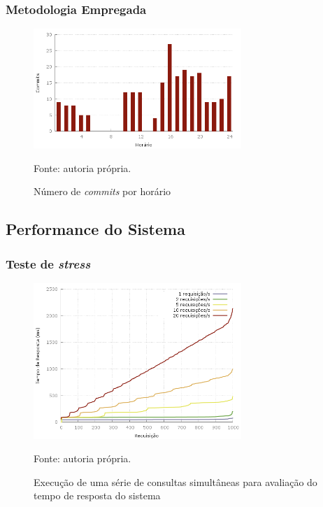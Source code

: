 \frame
{
\frametitle{Metodologia Empregada}
\begin{figure}
\includegraphics[width=0.7\textwidth]{./imgs/hour_of_day.png}
\caption{Número de \emph{commits} por horário}
\tiny
Fonte: autoria própria.
\end{figure}
}

\subsection{Performance do Sistema}
\frame
{
\frametitle{Teste de \emph{stress}}
\begin{figure}
\includegraphics[width=0.7\textwidth]{./imgs/out.png}
\caption{Execução de uma série de consultas simultâneas para avaliação do tempo de resposta do sistema}
\tiny
Fonte: autoria própria.
\end{figure}
}
